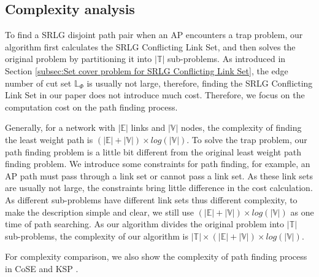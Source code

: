 \subsection{Complexity analysis}
\label{subsec:Complexity analysis}
To find a SRLG disjoint path pair when an AP encounters a trap problem, our algorithm first calculates the SRLG Conflicting Link Set, and then solves the original problem by partitioning it into $|\mathbb{T}|$ sub-problems. As introduced in Section \ref{subsec:Set cover problem for SRLG Conflicting Link Set},  the edge number of cut set $\mathbb{L}_{\Phi}$ is usually not large, therefore, finding the SRLG Conflicting Link Set in our paper does not introduce much cost. Therefore, we focus on the computation cost on the path finding process.

Generally, for a network with $|\mathbb{E}|$ links and $|\mathbb{V}|$ nodes, the complexity of finding the least weight path is $(|\mathbb{E}|+|\mathbb{V}|)\times log(|\mathbb{V}|)$. To solve the trap problem, our path finding problem is a little bit different from the original least weight path finding problem. We introduce some constraints for path finding, for example, an AP path must pass through a link set or cannot pass a link set. As these link sets are usually not large, the constraints bring little  difference in the cost calculation. As different sub-problems have different link sets thus different complexity, to make the description simple and clear, we still use $(|\mathbb{E}|+|\mathbb{V}|)\times log(|\mathbb{V}|)$ as one time of path searching. As our algorithm divides the original problem into $|\mathbb{T}|$ sub-problems, the complexity of our algorithm is $|\mathbb{T}|\times(|\mathbb{E}|+|\mathbb{V}|)\times log(|\mathbb{V}|)$.

For complexity comparison, we also show the complexity of path finding process in  CoSE \cite{rostami2007cose} and KSP \cite{eppstein1998finding}.

